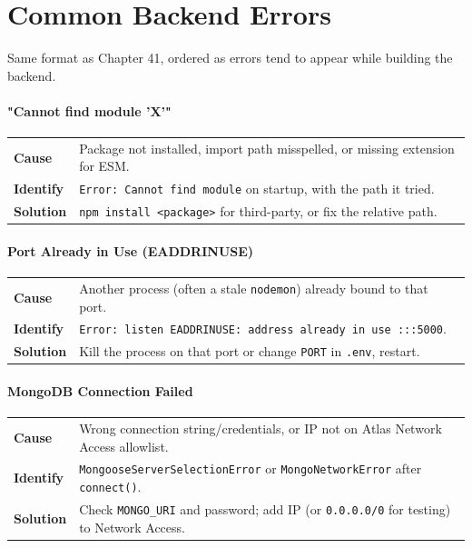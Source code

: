 \chapter{Common Backend Errors}

\begin{notebox}[NOTE]
Same format as Chapter 41, ordered as errors tend to appear while building the backend.
\end{notebox}

\subsubsection*{"Cannot find module 'X'"}
\noindent\begin{tabularx}{\textwidth}{@{}>{\bfseries}p{2.3cm}X@{}}
\toprule
Cause & Package not installed, import path misspelled, or missing extension for ESM. \\
Identify & \texttt{Error: Cannot find module} on startup, with the path it tried. \\
Solution & \texttt{npm install <package>} for third-party, or fix the relative path. \\
\bottomrule
\end{tabularx}

\subsubsection*{Port Already in Use (EADDRINUSE)}
\noindent\begin{tabularx}{\textwidth}{@{}>{\bfseries}p{2.3cm}X@{}}
\toprule
Cause & Another process (often a stale \texttt{nodemon}) already bound to that port. \\
Identify & \texttt{Error: listen EADDRINUSE: address already in use :::5000}. \\
Solution & Kill the process on that port or change \texttt{PORT} in \texttt{.env}, restart. \\
\bottomrule
\end{tabularx}

\subsubsection*{MongoDB Connection Failed}
\noindent\begin{tabularx}{\textwidth}{@{}>{\bfseries}p{2.3cm}X@{}}
\toprule
Cause & Wrong connection string/credentials, or IP not on Atlas Network Access allowlist. \\
Identify & \texttt{MongooseServerSelectionError} or \texttt{MongoNetworkError} after \texttt{connect()}. \\
Solution & Check \texttt{MONGO\_URI} and password; add IP (or \texttt{0.0.0.0/0} for testing) to Network Access. \\
\bottomrule
\end{tabularx}

